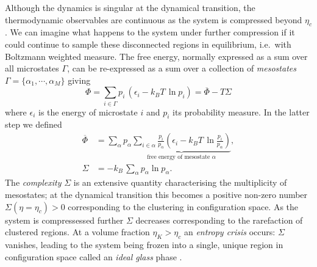 \documentclass[11pt,twoside]{report}
\begin{document}
Although the dynamics is singular at the dynamical transition, the thermodynamic observables are continuous as the system is compressed beyond $\eta_c$ \cite{ParisiRMP2010}.
We can imagine what happens to the system under further compression if it could continue to sample these disconnected regions in equilibrium, i.e.\ with Boltzmann weighted measure.
The free energy, normally expressed as a sum over all microstates%
$\Gamma$, can be re-expressed as a sum over a collection of \emph{mesostates} $\Gamma = \{\alpha_1, \cdots, \alpha_M\}$ giving
\begin{equation}
    \Phi = \sum_{i \in \Gamma} p_i \, (\epsilon_i - k_B T \, \ln{p_i})
    = \overline{\Phi} - T \Sigma
\end{equation}
where $\epsilon_i$ is the energy of microstate $i$ and $p_i$ its probability measure.
In the latter step we defined%
\begin{subequations}
  \begin{align}
    \overline{\Phi}
    &=
    \sum_\alpha p_\alpha
    \underbrace{
      \sum_{i \in \alpha} \frac{p_i}{p_\alpha}
      \left(
      \epsilon_i - k_B T \, \ln{\frac{p_i}{p_\alpha}}
      \right)
    }_\textrm{free energy of mesostate $\alpha$},
    \\
    \Sigma &= - k_B \, \sum_\alpha p_\alpha \ln{p_\alpha}.
  \end{align}
\end{subequations}
The \emph{complexity} $\Sigma$ is an extensive quantity characterising the multiplicity of mesostates; at the dynamical transition this becomes a positive non-zero number $\Sigma(\eta = \eta_c) > 0$ corresponding to the clustering in configuration space.
As the system is compressessed further $\Sigma$ decreases \cite{KirkpatrickPRB1987,KirkpatrickPRA1989,ParisiRMP2010} corresponding to the rarefaction of clustered regions.
At a volume fraction $\eta_K > \eta_c$ an \emph{entropy crisis} occurs: $\Sigma$ vanishes, leading to the system being frozen into a single, unique region in configuration space called an \emph{ideal glass} phase \cite{KauzmannCR1948,KirkpatrickPRB1987,HallJCP1987,KirkpatrickPRA1989,ParisiRMP2010,BerthierRMP2011}.
\end{document}
